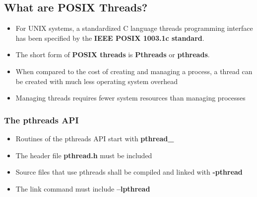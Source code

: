 \subsection{What are POSIX Threads?}
\begin{itemize}
  \item For UNIX systems, a standardized C language threads programming interface has been specified by the \textbf{IEEE POSIX 1003.1c standard}.
  \item The short form of \textbf{POSIX threads} is \textbf{Pthreads} or \textbf{pthreads}.
  \item When compared to the cost of creating and managing a process, a thread can be created with much less operating system overhead
  \item Managing threads requires fewer system resources than managing processes
\end{itemize}

\subsubsection{The pthreads API}
\begin{itemize}
  \item Routines of the pthreads API start with \textbf{pthread\_}
  \item The header file \textbf{pthread.h} must be included
  \item Source files that use pthreads shall be compiled and linked with \textbf{-pthread}
  \item The link command must include \textbf{–lpthread}
\end{itemize}

